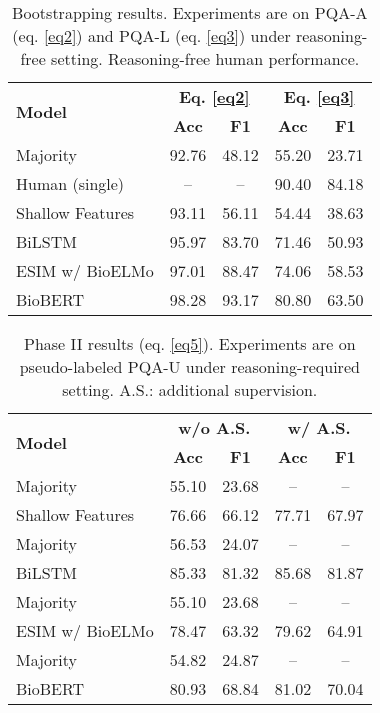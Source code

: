 \documentclass[11pt,a4paper]{article}
\begin{document}
\begin{table}
    \small
    \centering
    \begin{tabular}{lcccc}
        \toprule
        \multirow{2}{*}{\textbf{Model}} & 
        \multicolumn{2}{c}{\textbf{Eq. \ref{eq2}}} &
        \multicolumn{2}{c}{\textbf{Eq. \ref{eq3}}} \\
        \cmidrule{2-5}
        & \textbf{Acc} & \textbf{F1} & \textbf{Acc} & \textbf{F1} \\
        \midrule
        Majority & 92.76 & 48.12 & 55.20 & 23.71 \\
        Human (single) & -- & -- & 90.40 & 84.18 \\
        \midrule
        Shallow Features & 93.11 & 56.11 & 54.44 & 38.63 \\
        BiLSTM & 95.97 & 83.70 & 71.46 & 50.93 \\
        ESIM w/ BioELMo & 97.01 & 88.47 & 74.06 & 58.53 \\
        BioBERT & {98.28} & {93.17} & {80.80} & {63.50} \\
        \bottomrule
    \end{tabular}
    \vskip -0.15cm
    \caption{Bootstrapping results. Experiments are on PQA-A (eq. \ref{eq2}) and PQA-L (eq. \ref{eq3}) under reasoning-free setting. Reasoning-free human performance.} 
    \label{tab:bootstrap}
\end{table}

\begin{table}
    \small
    \centering
    \begin{tabular}{lcccc}
        \toprule
        \multirow{2}{*}{\textbf{Model}} & 
        \multicolumn{2}{c}{\textbf{w/o A.S.}} &
        \multicolumn{2}{c}{\textbf{w/ A.S.}} \\
        \cmidrule{2-5}
        & \textbf{Acc} & \textbf{F1} & \textbf{Acc} & \textbf{F1} \\
        \midrule
        Majority & 55.10 & 23.68 & -- & -- \\
        Shallow Features & 76.66 & 66.12 & 77.71 & 67.97 \\
        \midrule
        Majority & 56.53 & 24.07 & -- & -- \\
        BiLSTM & 85.33 & 81.32 & 85.68 & 81.87 \\
        \midrule
        Majority & 55.10 & 23.68 & -- & -- \\
        ESIM w/ BioELMo & 78.47 & 63.32 & 79.62 & 64.91 \\
        \midrule
        Majority & 54.82 & 24.87 & -- & -- \\        
        BioBERT & 80.93 & 68.84 & 81.02 & 70.04 \\
        \bottomrule
    \end{tabular}
    \vskip -0.15cm
    \caption{Phase II results (eq. \ref{eq5}). Experiments are on pseudo-labeled PQA-U under reasoning-required setting. A.S.: additional supervision.
    }    
    \label{tab:phaseii}
\end{table}
\end{document}
